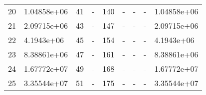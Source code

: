 \begin{table}
\begin{tabular}{lllllllll}
20 &  1.04858e+06 &   41 &     - &  140 &    - &     - &        - &  1.04858e+06 \\
21 &  2.09715e+06 &   43 &     - &  147 &    - &     - &        - &  2.09715e+06 \\
22 &   4.1943e+06 &   45 &     - &  154 &    - &     - &        - &   4.1943e+06 \\
23 &  8.38861e+06 &   47 &     - &  161 &    - &     - &        - &  8.38861e+06 \\
24 &  1.67772e+07 &   49 &     - &  168 &    - &     - &        - &  1.67772e+07 \\
25 &  3.35544e+07 &   51 &     - &  175 &    - &     - &        - &  3.35544e+07 \\
\bottomrule
\end{tabular}
\end{table}
